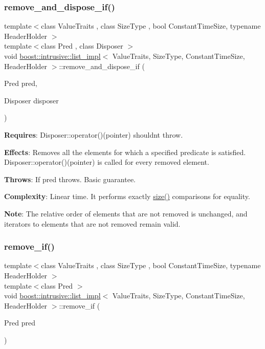 \subsubsection{\texorpdfstring{remove\+\_\+and\+\_\+dispose\+\_\+if()}{remove\_and\_dispose\_if()}}
{\footnotesize\ttfamily template$<$class Value\+Traits , class Size\+Type , bool Constant\+Time\+Size, typename Header\+Holder $>$ \\
template$<$class Pred , class Disposer $>$ \\
void \hyperlink{classboost_1_1intrusive_1_1list__impl}{boost\+::intrusive\+::list\+\_\+impl}$<$ Value\+Traits, Size\+Type, Constant\+Time\+Size, Header\+Holder $>$\+::remove\+\_\+and\+\_\+dispose\+\_\+if (\begin{DoxyParamCaption}\item[{Pred}]{pred,  }\item[{Disposer}]{disposer }\end{DoxyParamCaption})\hspace{0.3cm}{\ttfamily [inline]}}

{\bfseries Requires}\+: Disposer\+::operator()(pointer) shouldn\textquotesingle{}t throw.

{\bfseries Effects}\+: Removes all the elements for which a specified predicate is satisfied. Disposer\+::operator()(pointer) is called for every removed element.

{\bfseries Throws}\+: If pred throws. Basic guarantee.

{\bfseries Complexity}\+: Linear time. It performs exactly \hyperlink{classboost_1_1intrusive_1_1list__impl_a9da0074a31566f3a7dbc3cd1a2d752c1}{size()} comparisons for equality.

{\bfseries Note}\+: The relative order of elements that are not removed is unchanged, and iterators to elements that are not removed remain valid. \mbox{\label{classboost_1_1intrusive_1_1list__impl_ab74f15b0c56ff811322551eb7090be2d}} 
\subsubsection{\texorpdfstring{remove\+\_\+if()}{remove\_if()}}
{\footnotesize\ttfamily template$<$class Value\+Traits , class Size\+Type , bool Constant\+Time\+Size, typename Header\+Holder $>$ \\
template$<$class Pred $>$ \\
void \hyperlink{classboost_1_1intrusive_1_1list__impl}{boost\+::intrusive\+::list\+\_\+impl}$<$ Value\+Traits, Size\+Type, Constant\+Time\+Size, Header\+Holder $>$\+::remove\+\_\+if (\begin{DoxyParamCaption}\item[{Pred}]{pred }\end{DoxyParamCaption})\hspace{0.3cm}{\ttfamily [inline]}}

